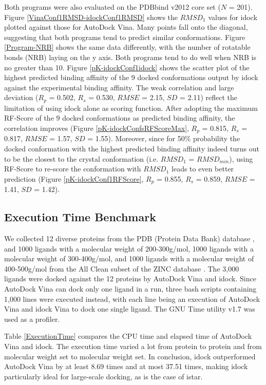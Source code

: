 \documentclass[10pt]{article}
\begin{document}
Both programs were also evaluated on the PDBbind v2012 core set ($N$ = 201). Figure \ref{VinaConf1RMSD-idockConf1RMSD} shows the $RMSD_1$ values for idock plotted against those for AutoDock Vina. Many points fall onto the diagonal, suggesting that both programs tend to predict similar conformations. Figure \ref{Program-NRB} shows the same data differently, with the number of rotatable bonds (NRB) laying on the y axis. Both programs tend to do well when NRB is no greater than 10. Figure \ref{pK-idockConf1idock} shows the scatter plot of the highest predicted binding affinity of the 9 docked conformations output by idock against the experimental binding affinity. The weak correlation and large deviation ($R_p$ = 0.502, $R_s$ = 0.530, $RMSE$ = 2.15, $SD$ = 2.11) reflect the limitation of using idock alone as scoring function. After adopting the maximum RF-Score of the 9 docked conformations as predicted binding affinity, the correlation improves (Figure \ref{pK-idockConfsRFScoreMax}, $R_p$ = 0.815, $R_s$ = 0.817, $RMSE$ = 1.57, $SD$ = 1.55). Moreover, since for 50\% probability the docked conformation with the highest predicted binding affinity indeed turns out to be the closest to the crystal conformation (i.e. $RMSD_1$ = $RMSD_{min}$), using RF-Score to re-score the conformation with $RMSD_1$ leads to even better prediction (Figure \ref{pK-idockConf1RFScore}, $R_p$ = 0.855, $R_s$ = 0.859, $RMSE$ = 1.41, $SD$ = 1.42).

\subsection*{Execution Time Benchmark}
We collected 12 diverse proteins from the PDB (Protein Data Bank) database \cite{540,537}, and 1000 ligands with a molecular weight of 200-300g/mol, 1000 ligands with a molecular weight of 300-400g/mol, and 1000 ligands with a molecular weight of 400-500g/mol from the All Clean subset of the ZINC database \cite{532,1178}. The 3,000 ligands were docked against the 12 proteins by AutoDock Vina and idock. Since AutoDock Vina can dock only one ligand in a run, three bash scripts containing 1,000 lines were executed instead, with each line being an execution of AutoDock Vina and idock Vina to dock one single ligand. The GNU Time utility v1.7 was used as a profiler.

Table \ref{ExecutionTime} compares the CPU time and elapsed time of AutoDock Vina and idock. The execution time varied a lot from protein to protein and from molecular weight set to molecular weight set. In conclusion, idock outperformed AutoDock Vina by at least 8.69 times and at most 37.51 times, making idock particularly ideal for large-scale docking, as is the case of istar.
\end{document}
